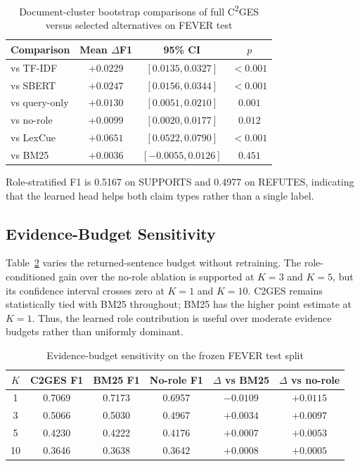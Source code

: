 \documentclass[applsci,article,submit,moreauthors]{Definitions/mdpi}
\newcommand{\cges}{C\textsuperscript{2}GES}
\begin{document}
\begin{table}[!ht]
\centering
\caption{Document-cluster bootstrap comparisons of full \cges{} versus selected alternatives on FEVER test}
\label{tab:bootstrap}
\begin{tabular}{lccc}
\toprule
Comparison & Mean $\Delta$F1 & 95\% CI & $p$ \\
\midrule
vs TF-IDF & $+0.0229$ & $[0.0135,0.0327]$ & $<0.001$ \\
vs SBERT & $+0.0247$ & $[0.0156,0.0344]$ & $<0.001$ \\
vs query-only & $+0.0130$ & $[0.0051,0.0210]$ & $0.001$ \\
vs no-role & $+0.0099$ & $[0.0020,0.0177]$ & $0.012$ \\
vs LexCue & $+0.0651$ & $[0.0522,0.0790]$ & $<0.001$ \\
vs BM25 & $+0.0036$ & $[-0.0055,0.0126]$ & $0.451$ \\
\bottomrule
\end{tabular}
\end{table}

Role-stratified F1 is 0.5167 on SUPPORTS and 0.4977 on REFUTES, indicating that the learned head helps both claim types rather than a single label.

\subsection{Evidence-Budget Sensitivity}
Table~\ref{tab:k-sensitivity} varies the returned-sentence budget without retraining. The role-conditioned gain over the no-role ablation is supported at $K=3$ and $K=5$, but its confidence interval crosses zero at $K=1$ and $K=10$. C2GES remains statistically tied with BM25 throughout; BM25 has the higher point estimate at $K=1$. Thus, the learned role contribution is useful over moderate evidence budgets rather than uniformly dominant.

\begin{table}[!ht]
\centering
\caption{Evidence-budget sensitivity on the frozen FEVER test split}
\label{tab:k-sensitivity}
\begin{tabular}{cccccc}
\toprule
$K$ & C2GES F1 & BM25 F1 & No-role F1 & $\Delta$ vs BM25 & $\Delta$ vs no-role \\
\midrule
1 & 0.7069 & 0.7173 & 0.6957 & $-0.0109$ & $+0.0115$ \\
3 & 0.5066 & 0.5030 & 0.4967 & $+0.0034$ & $+0.0097$ \\
5 & 0.4230 & 0.4222 & 0.4176 & $+0.0007$ & $+0.0053$ \\
10 & 0.3646 & 0.3638 & 0.3642 & $+0.0008$ & $+0.0005$ \\
\bottomrule
\end{tabular}
\end{table}
\end{document}

